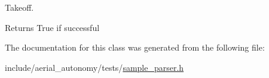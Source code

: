 Takeoff. 

\begin{DoxyReturn}{Returns}
True if successful 
\end{DoxyReturn}


The documentation for this class was generated from the following file\-:\begin{DoxyCompactItemize}
\item 
include/aerial\-\_\-autonomy/tests/\hyperlink{sample__parser_8h}{sample\-\_\-parser.\-h}\end{DoxyCompactItemize}
